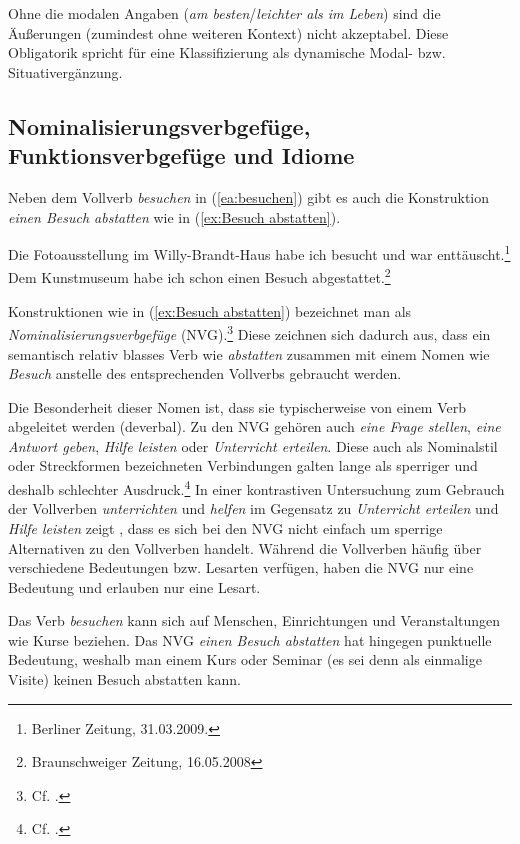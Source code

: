 Ohne die modalen Angaben (\textit{am besten}/\textit{leichter als im Leben}) sind die Äußerungen (zumindest ohne weiteren Kontext) nicht akzeptabel. Diese Obligatorik spricht für eine Klassifizierung als dynamische Modal- bzw. Situativergänzung.


\subsection{Nominalisierungsverbgefüge, Funktionsverbgefüge und Idiome}\label{subsection:IdiomeNVGFVG}

Neben dem Vollverb \textit{besuchen} in (\ref{ea:besuchen}) gibt es auch die Konstruktion \textit{einen Besuch abstatten} wie in (\ref{ex:Besuch abstatten}).

\ea \label{ea:NGV}
\ea \label{ea:besuchen} Die Fotoausstellung im Willy-Brandt-Haus habe ich besucht und war enttäuscht.\footnote{Berliner Zeitung, 31.03.2009.} 
\ex \label{ex:Besuch abstatten} Dem Kunstmuseum habe ich schon einen Besuch abgestattet.\footnote{Braunschweiger Zeitung, 16.05.2008}
\z 
\z 

Konstruktionen wie in (\ref{ex:Besuch abstatten}) bezeichnet man als  \textit{Nominalisierungsverbgefüge} (NVG).\footnote{Cf. \citet[169--170]{Polenz1989}.} Diese zeichnen sich dadurch aus, dass ein semantisch relativ blasses Verb wie \textit{abstatten} zusammen mit einem Nomen wie \textit{Besuch} anstelle des entsprechenden Vollverbs gebraucht werden. 

Die Besonderheit dieser Nomen ist, dass sie typischerweise von einem Verb abgeleitet werden (deverbal). Zu den NVG gehören auch \textit{eine Frage stellen}, \textit{eine Antwort geben}, \textit{Hilfe leisten} oder \textit{Unterricht erteilen}. Diese auch als Nominalstil oder Streckformen bezeichneten Verbindungen galten lange als sperriger und deshalb schlechter Ausdruck.\footnote{Cf. \citet[9--10]{Daniels1963}.} In einer kontrastiven Untersuchung zum Gebrauch der Vollverben \textit{unterrichten} und \textit{helfen} im Gegensatz zu \textit{Unterricht erteilen} und \textit{Hilfe leisten} zeigt \citet[156--172]{Storrer2006}, dass es sich bei den NVG nicht einfach um sperrige Alternativen zu den Vollverben handelt. Während die Vollverben häufig über verschiedene Bedeutungen bzw. Lesarten verfügen, haben die NVG nur eine Bedeutung und erlauben nur eine Lesart.

Das Verb \textit{besuchen} kann sich auf Menschen, Einrichtungen und Veranstaltungen wie Kurse beziehen. Das NVG \textit{einen Besuch abstatten} hat hingegen punktuelle Bedeutung, weshalb man einem Kurs oder Seminar (es sei denn als einmalige Visite) keinen Besuch abstatten kann. 

